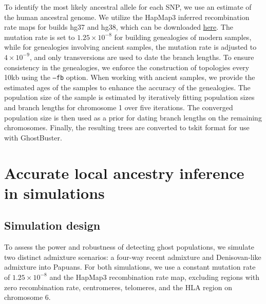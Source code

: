 To identify the most likely ancestral allele for each SNP, we use an estimate of the human ancestral genome. We utilize the HapMap3 inferred recombination rate maps for builds hg37 and hg38, which can be downloaded \href{https://github.com/odelaneau/shapeit5/tree/main/resources/maps/}{here}. The mutation rate is set to $1.25 \times 10^{-8}$ for building genealogies of modern samples, while for genealogies involving ancient samples, the mutation rate is adjusted to $4 \times 10^{-9}$, and only transversions are used to date the branch lengths. To ensure consistency in the genealogies, we enforce the construction of topologies every 10kb using the \texttt{--fb} option. When working with ancient samples, we provide the estimated ages of the samples to enhance the accuracy of the genealogies. The population size of the sample is estimated by iteratively fitting population sizes and branch lengths for chromosome 1 over five iterations. The converged population size is then used as a prior for dating branch lengths on the remaining chromosomes. Finally, the resulting trees are converted to tskit format for use with GhostBuster.

\section{Accurate local ancestry inference in simulations}
\label{sec:ch2-gb-sim}
\subsection{Simulation design}
\label{sec:ch2-gb-sim}

To assess the power and robustness of detecting ghost populations, we simulate two distinct admixture scenarios: a four-way recent admixture and Denisovan-like admixture into Papuans. For both simulations, we use a constant mutation rate of $1.25 \times 10^{-8}$ and the HapMap3 recombination rate map, excluding regions with zero recombination rate, centromeres, telomeres, and the HLA region on chromosome 6.

